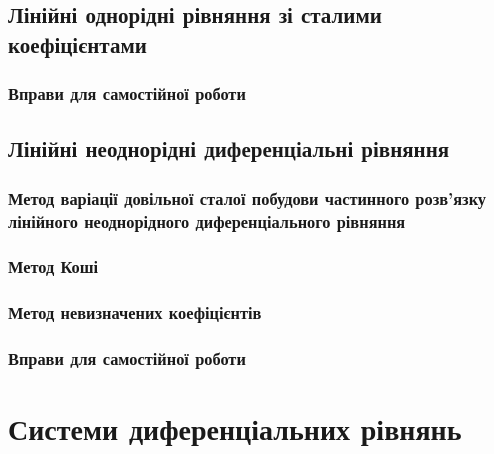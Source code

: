 \documentclass[a4paper, 12pt]{article}
\theoremstyle{definition}
\numberwithin{equation}{section}%
\numberwithin{equation}{subsection}
\begin{document}


\subsection{Лінійні однорідні рівняння зі сталими коефіцієнтами}



\subsubsection{Вправи для самостійної роботи}



\subsection{Лінійні неоднорідні диференціальні рівняння}



\subsubsection{Метод варіації довільної сталої побудови частинного роз\-в'яз\-ку лінійного неоднорідного диференціального рівняння}



\subsubsection{Метод Коші}



\subsubsection{Метод невизначених коефіцієнтів}



\subsubsection{Вправи для самостійної роботи}



\section{Системи диференціальних рівнянь}
\end{document}
